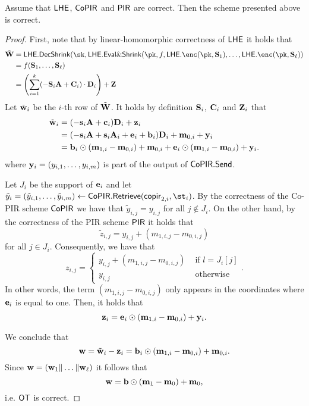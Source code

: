 \begin{theorem}
\label{theor:correctOT}
Assume that $\mathsf{LHE}$, $\mathsf{CoPIR}$ and $\mathsf{PIR}$ are correct. Then the scheme presented above is correct.
\end{theorem}
\begin{proof}
First, note that by linear-homomorphic correctness of $\mathsf{LHE}$ it holds that
\begin{align*}
\tilde{\vc{W}} &= \LHE.\decshrink(\sk,\LHE.\evalshrink(\pk,f,\LHE.\enc(\pk,\vc{S}_1),\dots,\LHE.\enc(\pk,\vc{S}_\ell))\\
&= f(\vc{S}_1,\dots,\vc{S}_\ell)\\
&= \left( \sum_{i = 1}^k (-\vc{S}_i\vc{A} + \vc{C}_i)\cdot \vc{D}_i \right) + \vc{Z}
\end{align*}
Let $\tilde{\mathbf{w}}_i$ be the $i$-th row of $\tilde{\mathbf{W}}$. It holds by definition $\mathbf{S}_i$, $\mathbf{C}_i$ and $\mathbf{Z}_i$ that
\begin{align*}
\tilde{\mathbf{w}}_i &= (-\mathbf{s}_i\mathbf{A} + \mathbf{c}_i)\mathbf{D}_i + \mathbf{z}_i\\
&= (-\mathbf{s}_i\mathbf{A} + \mathbf{s}_i\mathbf{A}_i +\mathbf{e}_i + \mathbf{b}_i)\mathbf{D}_i + \mathbf{m}_{0,i} + \mathbf{y}_i\\
&= \mathbf{b}_i \odot (\mathbf{m}_{1,i} - \mathbf{m}_{0,i}) + \mathbf{m}_{0,i} + \mathbf{e}_i \odot (\mathbf{m}_{1,i} - \mathbf{m}_{0,i}) + \mathbf{y}_i.
\end{align*}
where $\mathbf{y}_i=(y_{i,1},\dots, y_{i,m})$ is part of the output of $\mathsf{CoPIR}.\mathsf{Send}$.


Let $J_i$ be the support of $\mathbf{e}_i$ and let $\tilde y_i=(\tilde y_{i,1},\dots, \tilde y_{i,m})\leftarrow\CoPIR.\retrieve(\copir_{2,i},\st_i)$. By the correctness of the Co-PIR scheme $\mathsf{CoPIR}$ we have that $\tilde y_{i,j}=y_{i,j}$ for all $j\notin J_i$. On the other hand, by the correctness of the  PIR scheme $\mathsf{PIR}$ it holds that $$\tilde z_{i,j}=y_{i,j}+(m_{1,i,j}-m_{0,i,j})$$ for all $j\in J_i$. Consequently, we have that  $$z_{i,j}=\begin{cases}y_{i,j}  + (m_{1,i,j}-m_{0,i,j})& \text{ if } l = J_i[j] \\ y_{i,j} & \text{ otherwise} \end{cases}.$$ In other words, the term $(m_{1,i,j}-m_{0,i,j})$ only appears in the coordinates where $\mathbf{e}_i$ is equal to one. Then, it holds that $$\mathbf{z}_i=\mathbf{e}_i\odot (\mathbf{m}_{1,i}-\mathbf{m}_{0,i}) + \mathbf{y}_i.$$  

We conclude that $$\mathbf{w}=\tilde {\mathbf{w}}_i-\mathbf{z}_i= \mathbf{b}_i \odot (\mathbf{m}_{1,i} - \mathbf{m}_{0,i}) + \mathbf{m}_{0,i}.
$$
Since $\mathbf{w} = (\mathbf{w}_1 \| \dots \| \mathbf{w}_\ell)$ it follows that
\[
\mathbf{w} = \mathbf{b} \odot (\mathbf{m}_1 - \mathbf{m}_0) + \mathbf{m}_0,
\]
i.e. $\mathsf{OT}$ is correct.
\end{proof}



